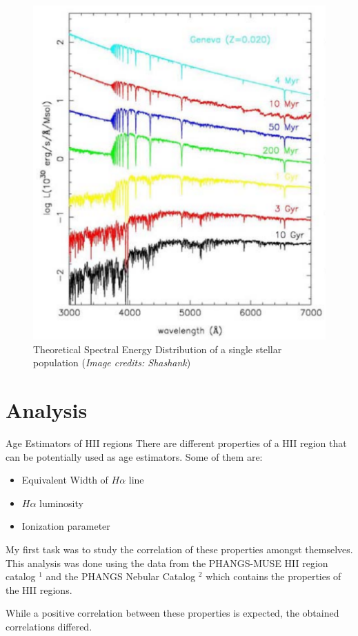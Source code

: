 \documentclass{beamer}
\begin{document}
\begin{frame}
    \begin{figure}[H]
        \centering
        \includegraphics[scale = 0.3]{image21.png}
        \caption{Theoretical Spectral Energy Distribution of a single stellar population (\textit{Image credits: Shashank})}
        \label{fig:image21}
    \end{figure}
    
\end{frame}

\section{Analysis}

\begin{frame}{Age Estimators of HII regions}
    There are different properties of a HII region that can be potentially used as age estimators. Some of them are:

    \begin{itemize}
        \item Equivalent Width of $H\alpha$ line
        \item $H\alpha$ luminosity
        \item Ionization parameter
    \end{itemize}

    My first task was to study the correlation of these properties amongst themselves. 
    This analysis was done using the data from the PHANGS-MUSE HII region catalog $^1$ and the PHANGS Nebular Catalog $^2$ which contains the properties of the HII regions. 

    While a positive correlation between these properties is expected, the obtained correlations differed. 
    
\end{frame}
\end{document}
